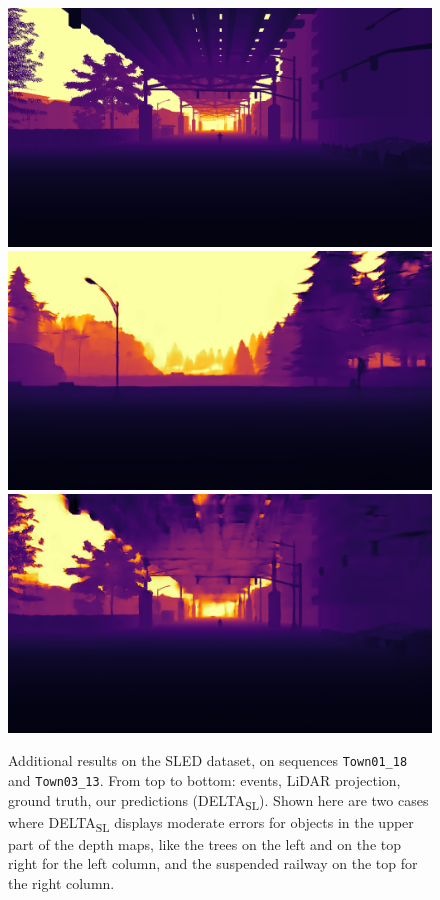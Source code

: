 \begin{figure}
  \includegraphics[width=0.475\linewidth]{mainmatter/figures/c_depth_transf/sled_dense_cmp_additional/data_and_gt/gtprev006552.png}\\
  \includegraphics[width=0.475\linewidth]{mainmatter/figures/c_depth_transf/sled_dense_cmp_additional/delta/predbf003720.png}
  \includegraphics[width=0.475\linewidth]{mainmatter/figures/c_depth_transf/sled_dense_cmp_additional/delta/predbf006552.png}
  \cprotect\caption{Additional results on the SLED dataset, on sequences \verb|Town01_18| and \verb|Town03_13|. From top to bottom: events, LiDAR projection, ground truth, our predictions (DELTA\textsubscript{SL}). Shown here are two cases where DELTA\textsubscript{SL} displays moderate errors for objects in the upper part of the depth maps, like the trees on the left and on the top right for the left column, and the suspended railway on the top for the right column.}\label{fig:appendix:delta:cmp_sled_additional_bad_0}
\end{figure}

